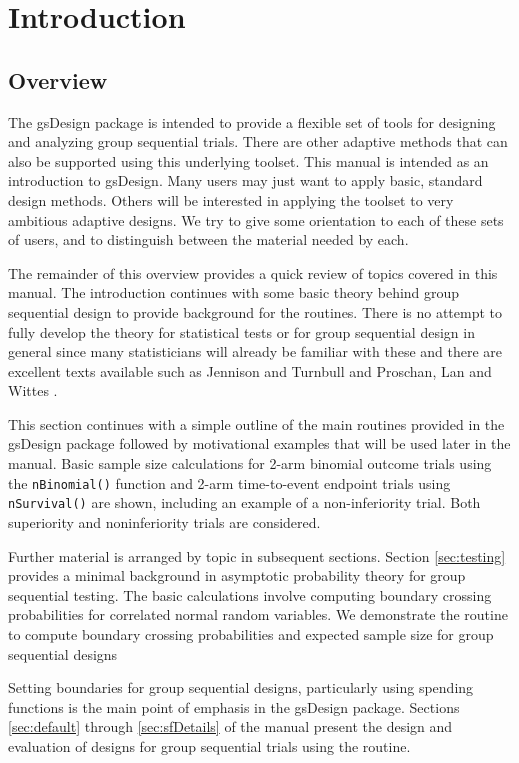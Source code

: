 \section{Introduction}
\subsection{Overview}
The gsDesign package is intended to provide a flexible set of tools for designing and analyzing group sequential trials.
There are other adaptive methods that can also be supported using this underlying toolset. 
This manual is intended as an introduction to gsDesign.
Many users may just want to apply basic, standard design methods.
Others will be interested in applying the toolset to very ambitious adaptive designs. 
We try to give some orientation to each of these sets of users, and to distinguish between the material needed by each.

The remainder of this overview provides a quick review of topics covered in this manual.
The introduction continues with some basic theory behind group sequential design to provide background for the routines.
There is no attempt to fully develop the theory for statistical tests or for group sequential design in general since many statisticians will already be familiar with these and there are excellent texts available such as Jennison and Turnbull \cite{JTBook} and Proschan, Lan and Wittes \cite{PLWBook}.

This section continues with a simple outline of the main routines provided in the gsDesign package followed by motivational examples that will be used later in the manual. Basic sample size calculations for 2-arm binomial outcome trials using the \texttt{nBinomial()} function and 2-arm time-to-event endpoint trials using \texttt{nSurvival()} are shown, including an example of a non-inferiority trial. Both superiority and noninferiority trials are considered.

Further material is arranged by topic in subsequent sections.
Section \ref{sec:testing} provides a minimal background in asymptotic probability theory for group sequential testing.
The basic calculations involve computing boundary crossing probabilities for correlated normal random variables.
We demonstrate the  routine to compute boundary crossing probabilities and expected sample size for group sequential designs

Setting boundaries for group sequential designs, particularly using spending functions is the main point of emphasis in the gsDesign package. 
Sections \ref{sec:default} through \ref{sec:sfDetails} of the manual present the design and evaluation of designs for group sequential trials using the  routine. 

